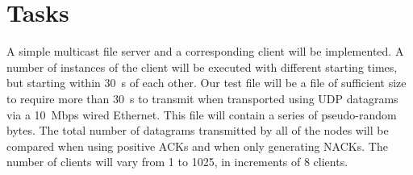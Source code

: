 \section{Tasks}
\label{sect:tasks}

A simple multicast file server and a corresponding client will be implemented. A number of instances of the client will be executed with different starting times, but starting within \SI{30}{\second} of each other. Our test file will be a file of sufficient size to require more than \SI{30}{\second} to transmit when transported using \gls{UDP} datagrams via a \SI{10}{Mbps} wired Ethernet. This file will contain a series of pseudo-random bytes. The total number of datagrams transmitted by all of the nodes will be compared when using positive \glspl{ACK} and when only generating \glspl{NACK}. The number of clients will vary from 1 to 1025, in increments of 8 clients.
